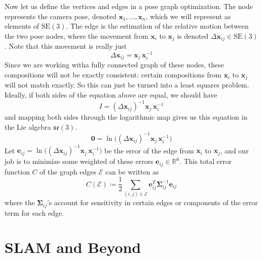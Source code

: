 \documentclass{article}
\begin{document}
  Now let us define the vertices and edges in a pose graph optimization. The node represents the camera pose, denoted $\mathbf{x}_1, \ldots, \mathbf{x}_n$, which we will represent as elements of $\mathrm{SE}(3)$. The edge is the estimation of the relative motion between the two pose nodes, where the movement from $\mathbf{x}_i$ to $\mathbf{x}_j$ is denoted $\Delta \mathbf{x}_{ij} \in \mathrm{SE}(3)$. Note that this movement is really just 
  \begin{equation}
    \Delta \mathbf{x}_{ij} = \mathbf{x}_{j} \, \mathbf{x}_i^{-1}
  \end{equation}
  Since we are working witha fully connected graph of these nodes, these compositions will not be exactly consistent: certain compositions from $\mathbf{x}_i$ to $\mathbf{x}_j$ will not match exactly. So this can just be turned into a least squares problem. Ideally, if both sides of the equation above are equal, we should have 
  \begin{equation}
    I = (\Delta \mathbf{x}_{ij})^{-1}\mathbf{x}_{j} \, \mathbf{x}_i^{-1}
  \end{equation}
  and mapping both sides through the logarithmic map gives us this equation in the Lie algebra $\mathfrak{se}(3)$. 
  \begin{equation}
    \mathbf{0} = \ln \big(  (\Delta \mathbf{x}_{ij})^{-1}\mathbf{x}_{j} \, \mathbf{x}_i^{-1}\big)
  \end{equation}
  Let $\mathbf{e}_{ij} = \ln \big(  (\Delta \mathbf{x}_{ij})^{-1}\mathbf{x}_{j} \, \mathbf{x}_i^{-1}\big)$ be the error of the edge from $\mathbf{x}_i$ to $\mathbf{x}_j$, and our job is to minimize some weighted of these errors $\mathbf{e}_{ij} \in \mathbb{R}^6$. This total error function $C$ of the graph edges $\mathcal{E}$ can be written as 
  \begin{equation}
    C(\mathcal{E}) \coloneqq \frac{1}{2} \sum_{(i, j) \in \mathcal{E}} \mathbf{e}_{ij}^T \boldsymbol{\Sigma}_{ij}^{-1} \mathbf{e}_{ij}
  \end{equation}
  where the $\boldsymbol{\Sigma}_{ij}$'s account for sensitivity in certain edges or components of the error term for each edge. 

\section{SLAM and Beyond}
\end{document}
